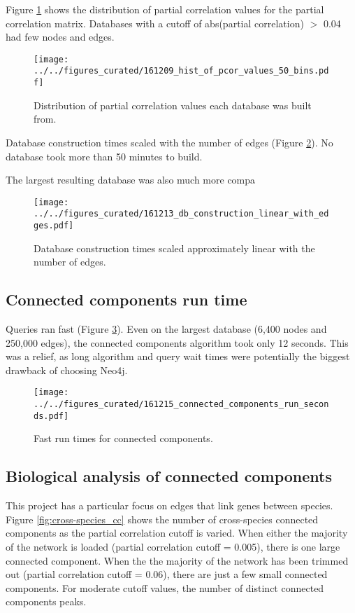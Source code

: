 \documentclass[12pt]{article}
\begin{document}
Figure \ref{fig:pcor_hist}  shows the distribution of partial correlation values for the partial correlation matrix.  
Databases with a cutoff of abs(partial correlation) $>$ 0.04 had few nodes and edges. 

\begin{figure}[H]
    \captionsetup{width=0.6\textwidth}
    \centering
    \texttt{[image: ../../figures\_curated/161209\_hist\_of\_pcor\_values\_50\_bins.pdf]}
    \caption{Distribution of partial correlation values each database was built from.}
    \label{fig:pcor_hist}
\end{figure}

Database construction times scaled with the number of edges (Figure \ref{fig:build_times}).  
No database took more than 50 minutes to build.

The largest resulting database was also much more compa
\begin{figure}[H]
    \captionsetup{width=0.6\textwidth}
    \centering
    \texttt{[image: ../../figures\_curated/161213\_db\_construction\_linear\_with\_edges.pdf]}
    \caption{Database construction times scaled approximately linear with the number of edges.}
    \label{fig:build_times}
\end{figure}

\subsection{Connected components run time}

Queries ran fast (Figure \ref{fig:cc_times}). 
Even on the largest database (6,400 nodes and 250,000 edges), the connected components algorithm took only 12 seconds. 
This was a relief, as long algorithm and query wait times were potentially the biggest drawback of choosing Neo4j.

\begin{figure}[H]
    \captionsetup{width=0.6\textwidth}
    \centering
    \texttt{[image: ../../figures\_curated/161215\_connected\_components\_run\_seconds.pdf]}
    \caption{Fast run times for connected components.}
    \label{fig:cc_times}
\end{figure}


\subsection{Biological analysis of connected components}

This project has a particular focus on edges that link genes between species. 
Figure \ref{fig:cross-species_cc} shows the number of cross-species connected components as the partial correlation cutoff is varied. 
When either the majority of the network is loaded (partial correlation cutoff = 0.005), there is one large connected component.
When the the majority of the network has been trimmed out (partial correlation cutoff = 0.06), there are just a few small connected components.
For moderate cutoff values, the number of distinct connected components peaks.
\end{document}
